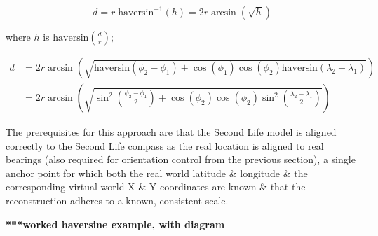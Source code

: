 \begin{equation}
	\label{haversine3}
	d = r\;\text{haversin}^{-1}\left( h \right) = 2r \arcsin \left( \sqrt{h} \right)
\end{equation}

where $h$ is $\text{haversin}\left( \frac{d}{r} \right)$;

\begin{align}
d & = 2r \arcsin\left( \sqrt{\text{haversin} \left( \phi_{2} - \phi_{1} \right) + \cos \left( \phi_{1} \right) \cos  \left( \phi_{2} \right) \text{haversin} \left( \lambda_{2} - \lambda_{1} \right) } \right) \nonumber \\ 
& = 2r \arcsin\left( \sqrt{\sin^{2} \left( \frac{\phi_{2} - \phi_{1}}{2}\right) + \cos\left( \phi_{2} \right) \cos\left( \phi_{2} \right) \sin^{2} \left( \frac{\lambda_{2} - \lambda_{1}}{2} \right) } \right)
\end{align}

The prerequisites for this approach are that the Second Life model is aligned correctly to the Second Life compass as the real location is aligned to real bearings (also required for orientation control from the previous section), a single anchor point for which both the real world latitude \& longitude \& the corresponding virtual world X \& Y coordinates are known \& that the reconstruction adheres to a known, consistent scale.

\textbf{***worked haversine example, with diagram}



